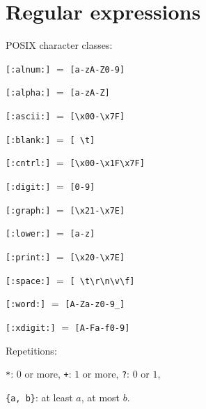 \section{Regular expressions}
\begin{itemx}
\item POSIX character classes:
\begin{itemx}
\item \texttt{[:alnum:]} $=$ \texttt{[a-zA-Z0-9]}
\item \texttt{[:alpha:]} $=$ \texttt{[a-zA-Z]}
\item \texttt{[:ascii:]} $=$ \texttt{[\textbackslash{}x00-\textbackslash{}x7F]}
\item \texttt{[:blank:]} $=$ \texttt{[ \textbackslash{}t]}
\item \texttt{[:cntrl:]} $=$ \texttt{[\textbackslash{}x00-\textbackslash{}x1F\textbackslash{}x7F]}
\item \texttt{[:digit:]} $=$ \texttt{[0-9]}
\item \texttt{[:graph:]} $=$ \texttt{[\textbackslash{}x21-\textbackslash{}x7E]}
\item \texttt{[:lower:]} $=$ \texttt{[a-z]}
\item \texttt{[:print:]} $=$ \texttt{[\textbackslash{}x20-\textbackslash{}x7E]}
\item \texttt{[:space:]} $=$ \texttt{[ \textbackslash{}t\textbackslash{}r\textbackslash{}n\textbackslash{}v\textbackslash{}f]}
\item \texttt{[:word:]} $=$ \texttt{[A-Za-z0-9\_]}
\item \texttt{[:xdigit:]} $=$ \texttt{[A-Fa-f0-9]}
\end{itemx}
\item Repetitions:
\begin{itemx}
\item \texttt{*}: $0$ or more, \texttt{+}: $1$ or more, \texttt{?}: $0$ or $1$,
\item \texttt{\{a, b\}}: at least $a$, at most $b$.
\end{itemx}
\end{itemx}
